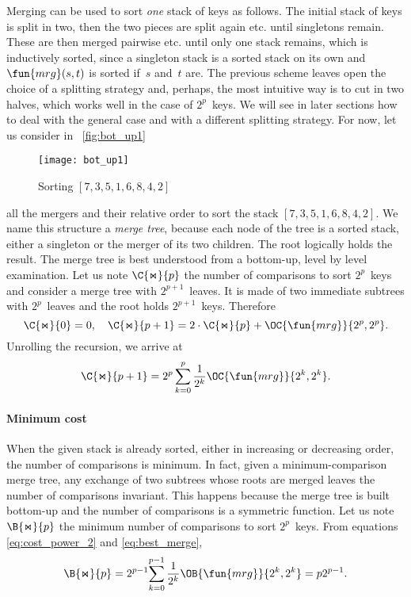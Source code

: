 Merging can be used to sort \emph{one} stack of keys as follows. The
initial stack of keys is split in two, then the two pieces are split
again etc. until singletons remain. These are then merged pairwise
etc. until only one stack remains, which is inductively sorted, since
a singleton stack is a sorted stack on its own and
\(\fun{mrg}(s,t)\) is sorted if~\(s\) and~\(t\)
are. The previous scheme leaves open the choice of a splitting
strategy and, perhaps, the most intuitive way is to cut in two halves,
which works well in the case of \(2^p\)~keys. We will see in later
sections how to deal with the general case and with a different
splitting strategy. For now, let us consider in
\fig~\vref{fig:bot_up1}
\begin{figure}
\centering
\texttt{[image: bot\_up1]}
\caption{Sorting \([7,3,5,1,6,8,4,2]\)}
\label{fig:bot_up1}
\end{figure}
all the mergers and their relative order to sort the stack \([7, 3, 5,
  1, 6, 8, 4, 2]\). We name this structure a \emph{merge
  tree}, because each node of the tree is a sorted stack, either a
singleton or the merger of its two children. The root logically holds
the result. The merge tree is best understood from a bottom\hyp{}up,
level by level examination. Let us note \(\C{\Join}{p}\) the number of
comparisons to sort \(2^p\)~keys and consider a merge tree with
\(2^{p+1}\)~leaves. It is made of two immediate subtrees with
\(2^p\)~leaves and the root holds \(2^{p+1}\)~keys. Therefore
\begin{equation*}
\C{\Join}{0} = 0,
\quad
\C{\Join}{p+1} = 2 \cdot \C{\Join}{p} + \OC{\fun{mrg}}{2^p,2^p}.
\end{equation*}
Unrolling the recursion, we arrive at
\begin{equation}
\C{\Join}{p+1}
  = 2^p\sum_{k=0}^p{\frac{1}{2^k}\OC{\fun{mrg}}{2^k,2^k}}.
\index{mrg@$\C{\Join}{n}$}
\label{eq:cost_power_2}
\end{equation}

\paragraph{Minimum cost}

When the given stack is already sorted, either in increasing or
decreasing order, the number of comparisons is minimum. In fact, given
a minimum\hyp{}comparison merge tree, any
exchange of two subtrees whose roots are merged leaves the number of
comparisons invariant. This happens because the merge tree is built
bottom\hyp{}up and the number of comparisons is a symmetric
function. Let us note \(\B{\Join}{p}\) the minimum number of
comparisons to sort \(2^p\)~keys. From equations
\eqref{eq:cost_power_2} and \eqref{eq:best_merge},
\begin{equation}
\belowdisplayskip=0pt
\B{\Join}{p}
  = 2^{p-1}\!\sum_{k=0}^{p-1}{\frac{1}{2^k}\OB{\fun{mrg}}{2^k,2^k}}
  = p2^{p-1}.\label{eq:best_power}\index{mrg@$\B{\Join}{n}$}
\end{equation}

